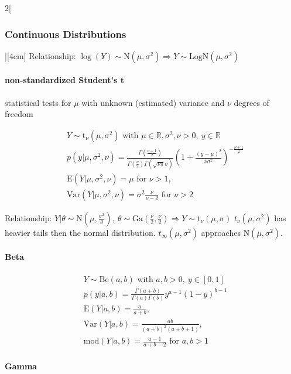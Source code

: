 \documentclass[8pt]{extarticle}
\begin{document}
\begin{multicols}{2}[\subsubsection{Continuous Distributions}][4cm]
\noindent Relationship: $\log (Y) \sim \mathrm{N}(\mu, \sigma^2) \Rightarrow Y \sim \mathrm{LogN}(\mu, \sigma^2)$
  
    \paragraph{non-standardized Student's t} statistical tests for $\mu$ with unknown (estimated) variance and $\nu$ degrees of freedom
  
    \begin{align*}
    & Y \sim \mathrm{t}_\nu(\mu, \sigma^2) \text{ with } \mu \in \mathbb{R}, \sigma^2, \nu > 0,\: y \in \mathbb{R}\\
    & p(y|\mu, \sigma^2, \nu) =\frac{\Gamma \left( \frac{\nu + 1}{2}\right) }{\Gamma (\frac{\nu}{2}) \Gamma (\sqrt{\nu\pi}\sigma)} \left(1+ \frac{(y-\mu)^2}{\nu \sigma^2} \right)^{-\frac{\nu + 1}{2}} \\
    & \mathrm{E}(Y|\mu, \sigma^2, \nu) = \mu \text{ for }  \nu > 1,\\
    & \mathrm{Var}(Y|\mu, \sigma^2, \nu) = \sigma^2 \frac{\nu}{\nu-2} \text{ for }  \nu > 2
  \end{align*}
  
 \noindent Relationship: $Y|\theta \sim \mathrm{N}(\mu, \frac{\sigma^2}{\theta}), \: \theta \sim  \mathrm{Ga}(\frac{\nu}{2}, \frac{\nu}{2}) \Rightarrow Y \sim \mathrm{t}_\nu(\mu, \sigma)$ 
 $t_\nu(\mu,\sigma^2)$ has heavier tails then the normal distribution. $t_\infty(\mu,\sigma^2)$ approaches $\mathrm{N}(\mu,\sigma^2)$.
  
	\paragraph{Beta}
  
    \begin{align*}
    & Y \sim \mathrm{Be}(a, b) \text{ with } a,b > 0,\: y \in \left[0,1\right]\\
    & p(y|a, b) =\frac{\Gamma \left( a+b\right) }{\Gamma (a) \Gamma (b)} y^{a-1} (1-y)^{b-1} \\
    & \mathrm{E}(Y|a, b) = \frac{a}{a+b},\\
    & \mathrm{Var}(Y|a, b) = \frac{ab}{\left(a+b\right)^2(a+b+1)}, \\
    & \mathrm{mod}(Y|a, b) = \frac{a-1}{a+b-2} \text{ for } a,b > 1
  \end{align*}
  
  
  	\paragraph{Gamma}
  

\end{multicols}
\end{document}
